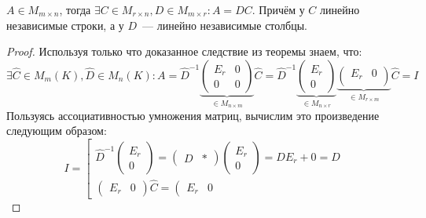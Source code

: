 \begin{statement}
    $A\in M_{m\times n}$, тогда $\exists C\in M_{r\times n},
    D\in M_{m\times r}\colon A = DC$. Причём у $C$ линейно независимые строки,
    а у $D$~--- линейно независимые столбцы.
\end{statement}
\begin{proof}
    Используя только что доказанное следствие из теоремы 
    знаем, что: 
    \[
        \exists \hat{C} \in M_m(K), \hat{D} \in M_n(K)
        \colon A = \hat{D}^{-1}
        \underbrace{\left(\begin{array}{c|c}
                E_r & 0\\
                \hline
                0 & 0
        \end{array}\right)}_{\in M_{n\times m}} \hat{C} 
        = 
        \hat{D}^{-1}
        \underbrace{\left(\begin{array}{c}
                E_r\\
                \hline
                0
        \end{array}\right)}_{\in M_{n\times r}}
        \underbrace{\left(\begin{array}{c|c}
                E_r & 0 \\
        \end{array}\right)}_{\in M_{r\times m}} \hat{C} = I
    \]
    Пользуясь ассоциативностью умножения матриц, вычислим это произведение
    следующим образом:
    \[
    I = 
    \left[
        \begin{gathered}
        \hat{D}^{-1}
        \left(\begin{array}{c}
            E_r\\
            \hline
            0
        \end{array}\right) 
        =
        \left(\begin{array}{c|c}
                D & *
        \end{array}\right)
        \left(\begin{array}{c}
            E_r\\
            \hline
            0
        \end{array}\right)
        =
        D E_r + 0 = D\\
        \left(\begin{array}{c|c}
                E_r & 0
        \end{array}\right) \hat{C}
        =
        \left(\begin{array}{c|c}
                E_r & 0

\end{array}
\end{gathered}\]
\end{proof}
